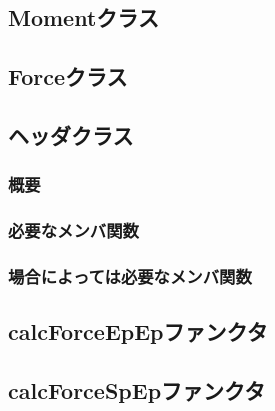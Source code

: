 

\subsection{Momentクラス}
\label{sec:moment}



\subsection{Forceクラス}
\label{sec:force}



\subsection{ヘッダクラス}

\subsubsection{概要}

\subsubsection{必要なメンバ関数}


\subsubsection{場合によっては必要なメンバ関数}






\subsection{calcForceEpEpファンクタ}

\subsection{calcForceSpEpファンクタ}
